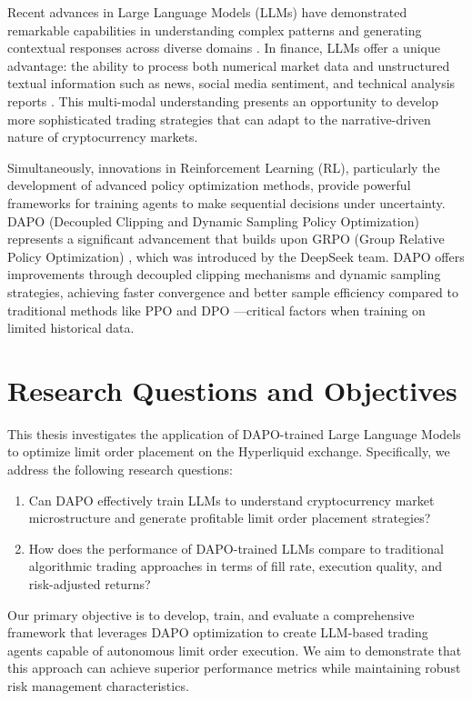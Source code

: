 \documentclass{report}
\begin{document}
Recent advances in Large Language Models (LLMs) have demonstrated remarkable capabilities in understanding complex patterns and generating contextual responses across diverse domains \cite{Brown2020, OpenAI2023}. In finance, LLMs offer a unique advantage: the ability to process both numerical market data and unstructured textual information such as news, social media sentiment, and technical analysis reports \cite{Wu2023, Lopez2023}. This multi-modal understanding presents an opportunity to develop more sophisticated trading strategies that can adapt to the narrative-driven nature of cryptocurrency markets.

Simultaneously, innovations in Reinforcement Learning (RL), particularly the development of advanced policy optimization methods, provide powerful frameworks for training agents to make sequential decisions under uncertainty. DAPO (Decoupled Clipping and Dynamic Sampling Policy Optimization) \cite{DAPO2025} represents a significant advancement that builds upon GRPO (Group Relative Policy Optimization) \cite{GRPO2024}, which was introduced by the DeepSeek team. DAPO offers improvements through decoupled clipping mechanisms and dynamic sampling strategies, achieving faster convergence and better sample efficiency compared to traditional methods like PPO \cite{Schulman2017} and DPO \cite{Rafailov2023}—critical factors when training on limited historical data.

\section{Research Questions and Objectives}

This thesis investigates the application of DAPO-trained Large Language Models to optimize limit order placement on the Hyperliquid exchange. Specifically, we address the following research questions:

\begin{enumerate}
\item Can DAPO effectively train LLMs to understand cryptocurrency market microstructure and generate profitable limit order placement strategies?
\item How does the performance of DAPO-trained LLMs compare to traditional algorithmic trading approaches in terms of fill rate, execution quality, and risk-adjusted returns?
\end{enumerate}

Our primary objective is to develop, train, and evaluate a comprehensive framework that leverages DAPO optimization to create LLM-based trading agents capable of autonomous limit order execution. We aim to demonstrate that this approach can achieve superior performance metrics while maintaining robust risk management characteristics.
\end{document}
